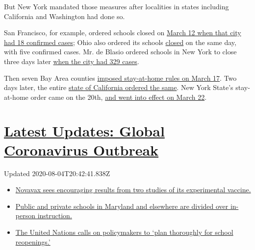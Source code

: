 But New York mandated those measures after localities in states
including California and Washington had done so.

San Francisco, for example, ordered schools closed on
\href{https://www.kron4.com/health/coronavirus/san-francisco-reports-4-new-coronavirus-cases-bringing-total-to-18/}{March
12 when that city had 18 confirmed cases}; Ohio also ordered its schools
\href{https://www.usnews.com/news/education-news/articles/2020-03-12/ohio-gov-mike-dewine-orders-all-k-12-schools-closed}{closed}
on the same day, with five confirmed cases. Mr. de Blasio ordered
schools in New York to close three days later
\href{https://www.governor.ny.gov/news/governor-cuomo-calls-president-trump-take-comprehensive-federal-action-combat-novel-coronavirus}{when
the city had 329 cases}.

Then seven Bay Area counties
\href{https://www.nytimes.com/2020/03/16/us/california-covid-19.html}{imposed
stay-at-home rules on March 17}. Two days later, the entire
\href{https://www.nytimes.com/2020/03/19/us/California-stay-at-home-order-virus.html}{state
of California ordered the same}. New York State's stay-at-home order
came on the 20th,
\href{https://www.nytimes.com/2020/03/20/us/ny-ca-stay-home-order.html}{and
went into effect on March 22}.

\hypertarget{latest-updates-global-coronavirus-outbreak}{%
\section{\texorpdfstring{\href{https://www.nytimes.com/2020/08/04/world/coronavirus-cases.html?action=click\&pgtype=Article\&state=default\&region=MAIN_CONTENT_1\&context=storylines_live_updates}{Latest
Updates: Global Coronavirus
Outbreak}}{Latest Updates: Global Coronavirus Outbreak}}\label{latest-updates-global-coronavirus-outbreak}}

Updated 2020-08-04T20:42:41.838Z

\begin{itemize}
\tightlist
\item
  \href{https://www.nytimes.com/2020/08/04/world/coronavirus-cases.html?action=click\&pgtype=Article\&state=default\&region=MAIN_CONTENT_1\&context=storylines_live_updates\#link-1228a480}{Novavax
  sees encouraging results from two studies of its experimental
  vaccine.}
\item
  \href{https://www.nytimes.com/2020/08/04/world/coronavirus-cases.html?action=click\&pgtype=Article\&state=default\&region=MAIN_CONTENT_1\&context=storylines_live_updates\#link-4825b93}{Public
  and private schools in Maryland and elsewhere are divided over
  in-person instruction.}
\item
  \href{https://www.nytimes.com/2020/08/04/world/coronavirus-cases.html?action=click\&pgtype=Article\&state=default\&region=MAIN_CONTENT_1\&context=storylines_live_updates\#link-50f7386d}{The
  United Nations calls on policymakers to `plan thoroughly for school
  reopenings.'}
\end{itemize}

